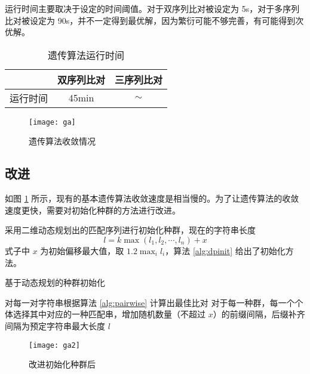     运行时间主要取决于设定的时间阈值。对于双序列比对被设定为 5s，对于多序列比对被设定为 90s，并不一定得到最优解，因为繁衍可能不够完善，有可能得到次优解。

    \noindent
    \begin{minipage}{0.6\textwidth}
        \begin{table}[H]
            \centering
            \caption{遗传算法运行时间}\label{tab:ga}
            \begin{tabular}{ccc}
                \toprule
                 & 双序列比对 & 三序列比对 \\
                \midrule
                运行时间 & 45min & $\sim$ \\
                \bottomrule
            \end{tabular}
        \end{table}
    \end{minipage}
    \begin{minipage}{0.4\textwidth}
        \begin{figure}[H]
            \centering
            \texttt{[image: ga]}
            \caption{遗传算法收敛情况}\label{fig:ga}
        \end{figure}
    \end{minipage}
    \vspace*{5pt}

    \subsection{改进}

    如图 \ref{fig:ga} 所示，现有的基本遗传算法收敛速度是相当慢的。为了让遗传算法的收敛速度更快，需要对初始化种群的方法进行改进。

    采用二维动态规划出的匹配序列进行初始化种群\cite{simplega}，现在的字符串长度
    \begin{equation}
        l = k\max{(l_1,l_2,\cdots,l_n)}+x
    \end{equation}
    式子中 $x$ 为初始偏移最大值，取 $1.2\max_i{l_i}$，算法 \ref{alg:dpinit} 给出了初始化方法。

    \noindent
    \begin{minipage}{0.6\textwidth}
        \begin{algorithm}[H]
            \caption{基于动态规划的种群初始化}\label{alg:dpinit}
            对每一对字符串根据算法 \ref{alg:pairwise} 计算出最佳比对\;
            对于每一种群，每一个个体选择其中对应的一种匹配串，增加随机数量（不超过 $x$）的前缀间隔，后缀补齐间隔为预定字符串最大长度 $l$\;
        \end{algorithm}
    \end{minipage}
    \begin{minipage}{0.4\textwidth}
        \begin{figure}[H]
            \centering
            \texttt{[image: ga2]}
            \caption{改进初始化种群后}\label{fig:ga2}
        \end{figure}
    \end{minipage}
    \vspace*{5pt}

